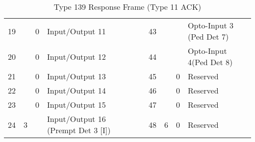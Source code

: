 \documentclass[]{article}
\begin{document}
\begin{landscape}
\begin{table}[]
\begin{tabular}{lllllllll}
			19           &                     & 0              & \cellcolor[HTML]{EFEFEF}Input/Output 11 &                    & 43           &                     &                & Opto-Input 3 (Ped Det 7)                        \\
			20           &                     & 0              & \cellcolor[HTML]{EFEFEF}Input/Output 12 &                    & 44           &                     &                & Opto-Input 4(Ped Det 8)                         \\ \cline{8-9} 
			21           &                     & 0              & \cellcolor[HTML]{EFEFEF}Input/Output 13 &                    & 45           &                     & 0              & Reserved                                        \\
			22           &                     & 0              & \cellcolor[HTML]{EFEFEF}Input/Output 14 &                    & 46           &                     & 0              & Reserved                                        \\
			23           &                     & 0              & \cellcolor[HTML]{EFEFEF}Input/Output 15 &                    & 47           &                     & 0              & Reserved                                        \\ \cline{3-4}
			24           & \multirow{-8}{*}{3} &                & Input/Output 16 (Prempt Det 3 {[}I{]})  &                    & 48           & \multirow{-8}{*}{6} & 0              & Reserved                                        \\ \cline{1-4} \cline{6-9} 
		\end{tabular}
		\caption{Type 139 Response Frame (Type 11 ACK)}
		\label{tab:type-139-frame}
	\end{table}
\end{landscape}
\end{document}
